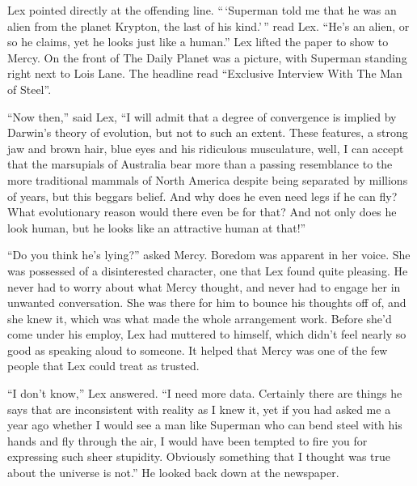 \documentclass[ebook,12pt]{memoir}
\begin{document}
Lex pointed directly at the offending line. ``\,`Superman told me that
he was an alien from the planet Krypton, the last of his kind.'\,'' read
Lex. ``He's an alien, or so he claims, yet he looks just like a human.''
Lex lifted the paper to show to Mercy. On the front of The Daily Planet
was a picture, with Superman standing right next to Lois Lane. The
headline read ``Exclusive Interview With The Man of Steel''.

``Now then,'' said Lex, ``I will admit that a degree of convergence is
implied by Darwin's theory of evolution, but not to such an extent.
These features, a strong jaw and brown hair, blue eyes and his
ridiculous musculature, well, I can accept that the marsupials of
Australia bear more than a passing resemblance to the more traditional
mammals of North America despite being separated by millions of years,
but this beggars belief. And why does he even need legs if he can fly?
What evolutionary reason would there even be for that? And not only does
he look human, but he looks like an attractive human at that!''

``Do you think he's lying?'' asked Mercy. Boredom was apparent in her
voice. She was possessed of a disinterested character, one that Lex
found quite pleasing. He never had to worry about what Mercy thought,
and never had to engage her in unwanted conversation. She was there for
him to bounce his thoughts off of, and she knew it, which was what made
the whole arrangement work. Before she'd come under his employ, Lex had
muttered to himself, which didn't feel nearly so good as speaking aloud
to someone. It helped that Mercy was one of the few people that Lex
could treat as trusted.

``I don't know,'' Lex answered. ``I need more data. Certainly there are
things he says that are inconsistent with reality as I knew it, yet if
you had asked me a year ago whether I would see a man like Superman who
can bend steel with his hands and fly through the air, I would have been
tempted to fire you for expressing such sheer stupidity. Obviously
something that I thought was true about the universe is not.'' He looked
back down at the newspaper.
\end{document}
